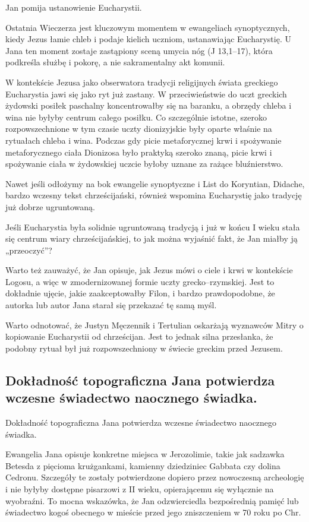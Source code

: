 Jan pomija ustanowienie Eucharystii.

Ostatnia Wieczerza jest kluczowym momentem w ewangeliach synoptycznych, kiedy Jezus łamie chleb i podaje kielich uczniom, ustanawiając Eucharystię.
U Jana ten moment zostaje zastąpiony sceną umycia nóg (J 13,1–17), która podkreśla służbę i pokorę, a nie sakramentalny akt komunii.

W kontekście Jezusa jako obserwatora tradycji religijnych świata greckiego Eucharystia jawi się jako ryt już zastany.
W przeciwieństwie do uczt greckich żydowski posiłek paschalny koncentrowałby się na baranku, a obrzędy chleba i wina nie byłyby centrum całego posiłku.
Co szczególnie istotne, szeroko rozpowszechnione w tym czasie uczty dionizyjskie były oparte właśnie na rytuałach chleba i wina.
Podczas gdy picie metaforycznej krwi i spożywanie metaforycznego ciała Dionizosa było praktyką szeroko znaną, picie krwi i spożywanie ciała w żydowskiej uczcie byłoby uznane za rażące bluźnierstwo.

Nawet jeśli odłożymy na bok ewangelie synoptyczne i List do Koryntian, Didache, bardzo wczesny tekst chrześcijański, również wspomina Eucharystię jako tradycję już dobrze ugruntowaną.

Jeśli Eucharystia była solidnie ugruntowaną tradycją i już w końcu I wieku stała się centrum wiary chrześcijańskiej, to jak można wyjaśnić fakt, że Jan miałby ją „przeoczyć”?

Warto też zauważyć, że Jan opisuje, jak Jezus mówi o ciele i krwi w kontekście Logosu, a więc w zmodernizowanej formie uczty grecko–rzymskiej.
Jest to dokładnie ujęcie, jakie zaakceptowałby Filon, i bardzo prawdopodobne, że autorka lub autor Jana starał się przekazać tę samą myśl.

Warto odnotować, że Justyn Męczennik i Tertulian oskarżają wyznawców Mitry o kopiowanie Eucharystii od chrześcijan.
Jest to jednak silna przesłanka, że podobny rytuał był już rozpowszechniony w świecie greckim przed Jezusem.

\subsection{Dokładność topograficzna Jana potwierdza wczesne świadectwo naocznego świadka.}\label{subsec:johns-topographical-accuracy-confirms-an-early-eyewitness.}

Dokładność topograficzna Jana potwierdza wczesne świadectwo naocznego świadka.

Ewangelia Jana opisuje konkretne miejsca w Jerozolimie, takie jak sadzawka Betesda z pięcioma krużgankami, kamienny dziedziniec Gabbata czy dolina Cedronu.
Szczegóły te zostały potwierdzone dopiero przez nowoczesną archeologię i nie byłyby dostępne pisarzowi z II wieku, opierającemu się wyłącznie na wyobraźni.
To mocna wskazówka, że Jan odzwierciedla bezpośrednią pamięć lub świadectwo kogoś obecnego w mieście przed jego zniszczeniem w 70 roku po Chr.

